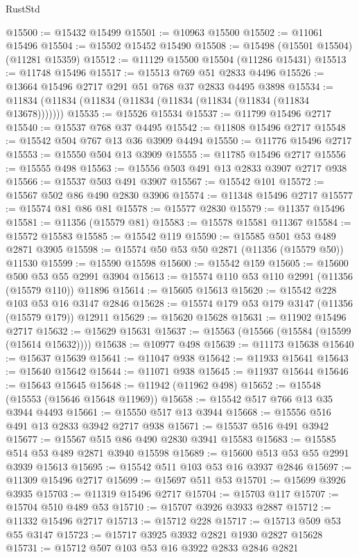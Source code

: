 \begin{lexlean}{RustStd}
\begin{coremodule}
{\begin{coremodule}
{{{{{{{{{{{{{{{{{{{{{{{{{{{{{{{{{@15500 := @15432 @15499
@15501 := @10963 @15500
@15502 := @11061 @15496
@15504 := @15502 @15452 @15490
@15508 := @15498 (@15501 @15504) (@11281 @15359)
@15512 := @11129 @15500 @15504 (@11286 @15431)
@15513 := @11748 @15496
@15517 := @15513 @769 @51 @2833 @4496
@15526 := @13664 @15496 @2717 @291 @51 @768 @37 @2833 @4495 @3898
@15534 := @11834 (@11834 (@11834 (@11834 (@11834 (@11834 (@11834 (@11834 @13678)))))))
@15535 := @15526 @15534
@15537 := @11799 @15496 @2717
@15540 := @15537 @768 @37 @4495
@15542 := @11808 @15496 @2717
@15548 := @15542 @504 @767 @13 @36 @3909 @4494
@15550 := @11776 @15496 @2717
@15553 := @15550 @504 @13 @3909
@15555 := @11785 @15496 @2717
@15556 := @15555 @498
@15563 := @15556 @503 @491 @13 @2833 @3907 @2717 @938
@15566 := @15537 @503 @491 @3907
@15567 := @15542 @101
@15572 := @15567 @502 @86 @490 @2830 @3906
@15574 := @11348 @15496 @2717
@15577 := @15574 @81 @86 @81
@15578 := @15577 @2830
@15579 := @11357 @15496
@15581 := @11356 (@15579 @81)
@15583 := @15578 @15581 @11367
@15584 := @15572 @15583
@15585 := @15542 @119
@15590 := @15585 @501 @53 @489 @2871 @3905
@15598 := @15574 @50 @53 @50 @2871 (@11356 (@15579 @50)) @11530
@15599 := @15590 @15598
@15600 := @15542 @159
@15605 := @15600 @500 @53 @55 @2991 @3904
@15613 := @15574 @110 @53 @110 @2991 (@11356 (@15579 @110)) @11896
@15614 := @15605 @15613
@15620 := @15542 @228 @103 @53 @16 @3147 @2846
@15628 := @15574 @179 @53 @179 @3147 (@11356 (@15579 @179)) @12911
@15629 := @15620 @15628
@15631 := @11902 @15496 @2717
@15632 := @15629 @15631
@15637 := @15563 (@15566 (@15584 (@15599 (@15614 @15632))))
@15638 := @10977 @498
@15639 := @11173 @15638
@15640 := @15637 @15639
@15641 := @11047 @938
@15642 := @11933 @15641
@15643 := @15640 @15642
@15644 := @11071 @938
@15645 := @11937 @15644
@15646 := @15643 @15645
@15648 := @11942 (@11962 @498)
@15652 := @15548 (@15553 (@15646 @15648 @11969))
@15658 := @15542 @517 @766 @13 @35 @3944 @4493
@15661 := @15550 @517 @13 @3944
@15668 := @15556 @516 @491 @13 @2833 @3942 @2717 @938
@15671 := @15537 @516 @491 @3942
@15677 := @15567 @515 @86 @490 @2830 @3941 @15583
@15683 := @15585 @514 @53 @489 @2871 @3940 @15598
@15689 := @15600 @513 @53 @55 @2991 @3939 @15613
@15695 := @15542 @511 @103 @53 @16 @3937 @2846
@15697 := @11309 @15496 @2717
@15699 := @15697 @511 @53
@15701 := @15699 @3926 @3935
@15703 := @11319 @15496 @2717
@15704 := @15703 @117
@15707 := @15704 @510 @489 @53
@15710 := @15707 @3926 @3933 @2887
@15712 := @11332 @15496 @2717
@15713 := @15712 @228
@15717 := @15713 @509 @53 @55 @3147
@15723 := @15717 @3925 @3932 @2821 @1930 @2827 @15628
@15731 := @15712 @507 @103 @53 @16 @3922 @2833 @2846 @2821
}}}}}}}}}}}}}}}}}}}}}}}}}}}}}}}}}
\end{coremodule}}
\end{coremodule}
\end{lexlean}
